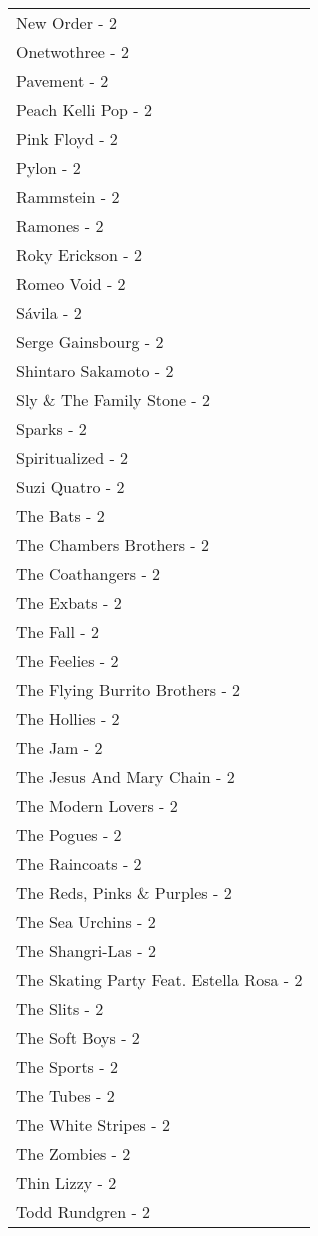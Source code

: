 \documentclass[
]{article}
\begin{document}
\begin{longtable}{l}
New Order - 2 \\ 
Onetwothree - 2 \\ 
Pavement - 2 \\ 
Peach Kelli Pop - 2 \\ 
Pink Floyd - 2 \\ 
Pylon - 2 \\ 
Rammstein - 2 \\ 
Ramones - 2 \\ 
Roky Erickson - 2 \\ 
Romeo Void - 2 \\ 
Sávila - 2 \\ 
Serge Gainsbourg - 2 \\ 
Shintaro Sakamoto - 2 \\ 
Sly \& The Family Stone - 2 \\ 
Sparks - 2 \\ 
Spiritualized - 2 \\ 
Suzi Quatro - 2 \\ 
The Bats - 2 \\ 
The Chambers Brothers - 2 \\ 
The Coathangers - 2 \\ 
The Exbats - 2 \\ 
The Fall - 2 \\ 
The Feelies - 2 \\ 
The Flying Burrito Brothers - 2 \\ 
The Hollies - 2 \\ 
The Jam - 2 \\ 
The Jesus And Mary Chain - 2 \\ 
The Modern Lovers - 2 \\ 
The Pogues - 2 \\ 
The Raincoats - 2 \\ 
The Reds, Pinks \& Purples - 2 \\ 
The Sea Urchins - 2 \\ 
The Shangri-Las - 2 \\ 
The Skating Party Feat. Estella Rosa - 2 \\ 
The Slits - 2 \\ 
The Soft Boys - 2 \\ 
The Sports - 2 \\ 
The Tubes - 2 \\ 
The White Stripes - 2 \\ 
The Zombies - 2 \\ 
Thin Lizzy - 2 \\ 
Todd Rundgren - 2 \\ 

\end{longtable}
\end{document}
